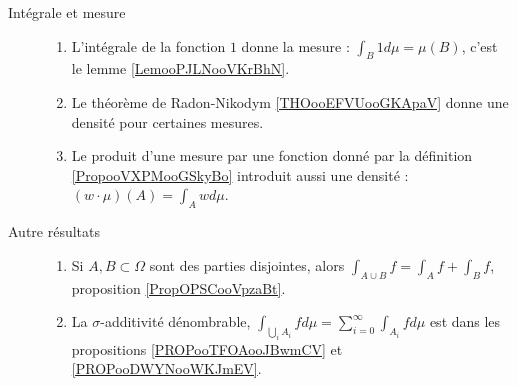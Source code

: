 \begin{description}
	\item[Intégrale et mesure]
	      \begin{enumerate}
		      \item
		            L'intégrale de la fonction \( 1\) donne la mesure : \( \int_B1d\mu=\mu(B)\), c'est le lemme \ref{LemooPJLNooVKrBhN}.
		      \item
		            Le théorème de Radon-Nikodym \ref{THOooEFVUooGKApaV} donne une densité pour certaines mesures.
		      \item
		            Le produit d'une mesure par une fonction donné par la définition \ref{PropooVXPMooGSkyBo} introduit aussi une densité : \( (w\cdot \mu)(A)=\int_Awd\mu\).
	      \end{enumerate}

	\item[Autre résultats]
	      \begin{enumerate}
		      \item
		            Si \( A,B\subset \Omega\) sont des parties disjointes, alors \( \int_{A\cup B}f=\int_Af+\int_Bf\), proposition \ref{PropOPSCooVpzaBt}.
		      \item
		            La \( \sigma\)-additivité dénombrable, \( \int_{\bigcup_iA_i}fd\mu=\sum_{i=0}^{\infty}\int_{A_i}fd\mu\) est dans les propositions \ref{PROPooTFOAooJBwmCV} et \ref{PROPooDWYNooWKJmEV}.
	      \end{enumerate}
\end{description}

